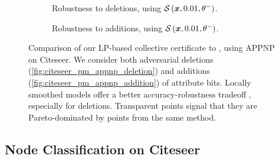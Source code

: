 \documentclass{article} %
\theoremstyle{plain}
\theoremstyle{definition}
\theoremstyle{remark}
\begin{document}
\begin{figure}[t]
	\centering
	\begin{subfigure}[b]{0.49\columnwidth}
		\resizebox{\textwidth}{!}{}
		\caption{
			Robustness to deletions, using $\mathcal{S}\left({\bm{x}}, 0.01, \theta^{-}\right)$.
		}
		\label{fig:citeseer_pm_appnp_deletion}
	\end{subfigure}
	\begin{subfigure}[b]{0.49\columnwidth}
		\resizebox{\textwidth}{!}{}
		\caption{
			Robustness to additions, using $\mathcal{S}\left({\bm{x}}, 0.01, \theta^{-}\right)$.
		}
		\label{fig:citeseer_pm_appnp_addition}
	\end{subfigure}
	\caption{Comparison of our LP-based collective certificate
 to \citet{Bojchevski2020}, using APPNP on Citeseer. We consider both adversarial deletions (\autoref{fig:citeseer_pm_appnp_deletion}) and additions (\autoref{fig:citeseer_pm_appnp_addition}) of attribute bits. Locally smoothed models offer a better accuracy-robustness tradeoff
 , especially for deletions. Transparent points signal that they are Pareto-dominated by points from the same method.}
	\label{fig:citeseer_pm_appnp}
	\vskip-0.2in
\end{figure}

\subsection{Node Classification on Citeseer}\label{section:experiments_graphs}
\end{document}
